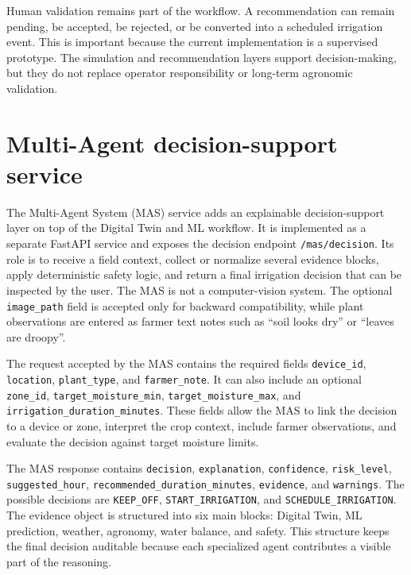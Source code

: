 Human validation remains part of the workflow. A recommendation can remain pending, be accepted, be rejected, or be converted into a scheduled irrigation event. This is important because the current implementation is a supervised prototype. The simulation and recommendation layers support decision-making, but they do not replace operator responsibility or long-term agronomic validation.

\section{Multi-Agent decision-support service}

The Multi-Agent System (MAS) service adds an explainable decision-support layer on top of the Digital Twin and ML workflow. It is implemented as a separate FastAPI service and exposes the decision endpoint \texttt{/mas/decision}. Its role is to receive a field context, collect or normalize several evidence blocks, apply deterministic safety logic, and return a final irrigation decision that can be inspected by the user. The MAS is not a computer-vision system. The optional \texttt{image\_path} field is accepted only for backward compatibility, while plant observations are entered as farmer text notes such as ``soil looks dry'' or ``leaves are droopy''.

The request accepted by the MAS contains the required fields \texttt{device\_id}, \texttt{location}, \texttt{plant\_type}, and \texttt{farmer\_note}. It can also include an optional \texttt{zone\_id}, \texttt{target\_moisture\_min}, \texttt{target\_moisture\_max}, and \texttt{irrigation\_duration\_minutes}. These fields allow the MAS to link the decision to a device or zone, interpret the crop context, include farmer observations, and evaluate the decision against target moisture limits.

The MAS response contains \texttt{decision}, \texttt{explanation}, \texttt{confidence}, \texttt{risk\_level}, \texttt{suggested\_hour}, \texttt{recommended\_duration\_minutes}, \texttt{evidence}, and \texttt{warnings}. The possible decisions are \texttt{KEEP\_OFF}, \texttt{START\_IRRIGATION}, and \texttt{SCHEDULE\_IRRIGATION}. The evidence object is structured into six main blocks: Digital Twin, ML prediction, weather, agronomy, water balance, and safety. This structure keeps the final decision auditable because each specialized agent contributes a visible part of the reasoning.

